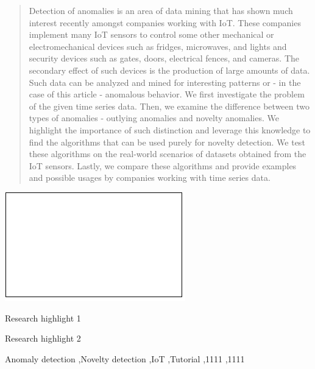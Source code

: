 \documentclass[preprint,12pt]{elsarticle}
\begin{document}
\begin{frontmatter}
\begin{abstract}
Detection of anomalies is an area of data mining that has shown much interest recently amongst companies working with IoT.
These companies implement many IoT sensors to control some other mechanical or electromechanical devices such as fridges, microwaves, and lights and security devices such as gates, doors, electrical fences, and cameras.
The secondary effect of such devices is the production of large amounts of data.
Such data can be analyzed and mined for interesting patterns or - in the case of this article - anomalous behavior.
We first investigate the problem of the given time series data.
Then, we examine the difference between two types of anomalies - outlying anomalies and novelty anomalies.
We highlight the importance of such distinction and leverage this knowledge to find the algorithms that can be used purely for novelty detection.
We test these algorithms on the real-world scenarios of datasets obtained from the IoT sensors.
Lastly, we compare these algorithms and provide examples and possible usages by companies working with time series data.
\end{abstract}

\begin{graphicalabstract}
\includegraphics{grabs}
\end{graphicalabstract}

\begin{highlights}
\item Research highlight 1
\item Research highlight 2
\end{highlights}

\begin{keyword}
Anomaly detection \sep Novelty detection \sep IoT \sep Tutorial
 \sep 1111
 \sep 1111
\end{keyword}

\end{frontmatter}
\end{document}

